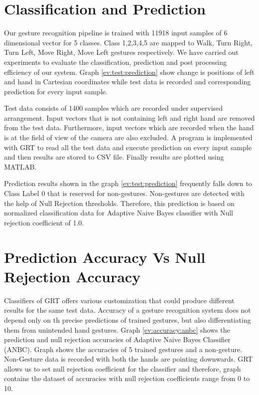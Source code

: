 \section{Classification and Prediction} Our gesture recognition pipeline is trained with 11918 input samples of 6 dimensional vector for 5 classes. Class 1,2,3,4,5 are mapped to Walk, Turn Right, Turn Left, Move Right, Move Left gestures respectively. We have carried out experiments to evaluate the classification, prediction and post processing efficiency of our system. Graph \ref{ev:test:prediction} show change is positions of left and hand in Cartesian coordinates while test data is recorded and corresponding prediction for every input sample.

Test data consists of 1400 samples which are recorded under supervised arrangement. Input vectors that is not containing left and right hand are removed from the test data. Furthermore, input vectors which are recorded when the hand is at the field of view of the camera are also excluded. A program is implemented with GRT to read all the test data and execute prediction on every input sample and then results are stored to CSV file. Finally results are plotted using MATLAB.

Prediction results shown in the graph \ref{ev:test:prediction} frequently falls down to Class Label 0 that is reserved for non-gestures. Non-gestures are detected with the help of Null Rejection thresholds. Therefore, this prediction is based on normalized classification data for Adaptive Naive Bayes classifier with Null rejection coefficient of 1.0.

\section{Prediction Accuracy Vs Null Rejection Accuracy} \label{sec:ev:accuracy} Classifiers of GRT offers various customization that could produce different results for the same test data. Accuracy of a gesture recognition system does not depend only on th precise predictions of trained gestures, but also differentiating them from unintended hand gestures. Graph \ref{ev:accuracy:anbc} shows the prediction and null rejection accuracies of Adaptive Naive Bayes Classifier (ANBC). Graph shows the accuracies of 5 trained gestures and a non-gesture. Non-Gesture data is recorded with both the hands are pointing downwards. GRT allows us to set null rejection coefficient for the classifier and therefore, graph contains the dataset of accuracies with null rejection coefficients range from 0 to 10.

